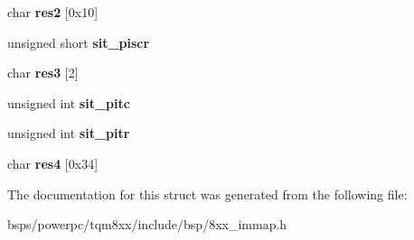 \begin{DoxyCompactItemize}
char {\bfseries res2} \mbox{[}0x10\mbox{]}
\item 
\mbox{\label{structsys__int__timers_ac51b928a5c3b4ba62990b1faa9775a2d}} 
unsigned short {\bfseries sit\+\_\+piscr}
\item 
\mbox{\label{structsys__int__timers_af3843a292061c584a6eafc66be89cf00}} 
char {\bfseries res3} \mbox{[}2\mbox{]}
\item 
\mbox{\label{structsys__int__timers_ad75a1ef28ebb4e240ff810dff90c2922}} 
unsigned int {\bfseries sit\+\_\+pitc}
\item 
\mbox{\label{structsys__int__timers_a31b8ba137ae824083f7e25fbd62c1fe8}} 
unsigned int {\bfseries sit\+\_\+pitr}
\item 
\mbox{\label{structsys__int__timers_ae270a8748b10ea13bfc002bd85726348}} 
char {\bfseries res4} \mbox{[}0x34\mbox{]}
\end{DoxyCompactItemize}


The documentation for this struct was generated from the following file\+:\begin{DoxyCompactItemize}
\item 
bsps/powerpc/tqm8xx/include/bsp/8xx\+\_\+immap.\+h\end{DoxyCompactItemize}
